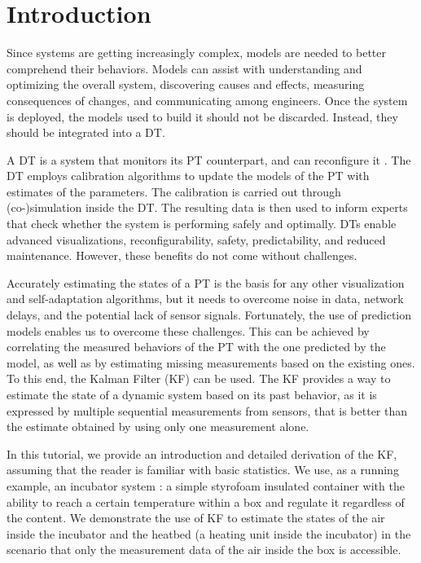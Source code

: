 \section{Introduction}
Since systems are getting increasingly complex, models are needed to better comprehend their behaviors. 
Models can assist with understanding and optimizing the overall system, discovering causes and effects, measuring consequences of changes, and communicating among engineers. 
Once the system is deployed, the models used to build it should not be discarded. 
Instead, they should be integrated into a DT. 

A DT is a system that monitors its PT counterpart, and can reconfigure it \cite{Wright2020,Tao2019a}.
The DT employs calibration algorithms to update the models of the PT with estimates of the parameters.
The calibration is carried out through (co-)simulation inside the DT.
The resulting data is then used to inform experts that check whether the system is performing safely and optimally.
DTs enable advanced visualizations, reconfigurability, safety, predictability, and reduced maintenance. 
However, these benefits do not come without challenges. 

Accurately estimating the states of a PT is the basis for any other visualization and self-adaptation algorithms, but it needs to overcome noise in data, network delays, and the potential lack of sensor signals. 
Fortunately, the use of prediction models enables us to overcome these challenges. This can be achieved by correlating the measured behaviors of the PT with the one predicted by the model, as well as by estimating missing measurements based on the existing ones. 
To this end, the Kalman Filter (KF) \cite{thrun2005probabilistic} can be used. 
The KF provides a way to estimate the state of a dynamic system based on its past behavior, as it is expressed by multiple sequential measurements from sensors, that is better than the estimate obtained by using only one measurement alone.

In this tutorial, we provide an introduction and detailed derivation of the KF, assuming that the reader is familiar with basic statistics.
We use, as a running example, an incubator system \cite{feng2021}: a simple styrofoam insulated container with the ability to reach a certain temperature within a box and regulate it regardless of the content. We demonstrate the use of KF to estimate the states of the air inside the incubator and the heatbed (a heating unit inside the incubator) in the scenario that only the measurement data of the air inside the box is accessible.


